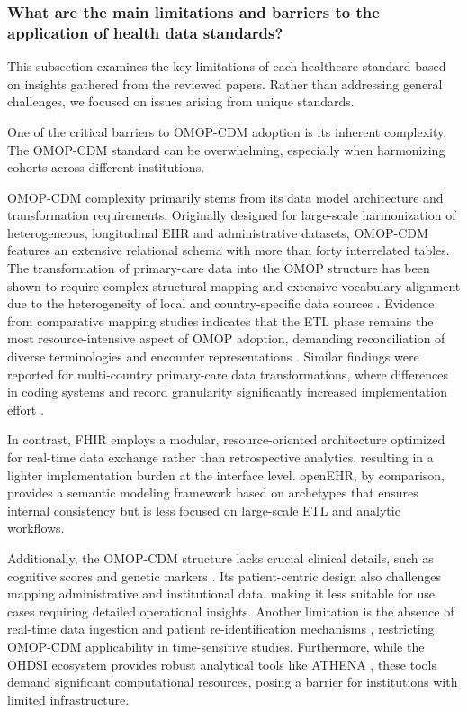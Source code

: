 \subsubsection{What are the main limitations and barriers to the application of health data standards?}
\label{sec:paper1_results_limitations}

This subsection examines the key limitations of each healthcare standard based on insights gathered from the reviewed papers. Rather than addressing general challenges, we focused on issues arising from unique standards.

One of the critical barriers to OMOP-CDM adoption is its inherent complexity. The OMOP-CDM standard can be overwhelming, especially when harmonizing cohorts across different institutions.

OMOP-CDM complexity primarily stems from its data model architecture and transformation requirements. Originally designed for large-scale harmonization of heterogeneous, longitudinal EHR and administrative datasets, OMOP-CDM features an extensive relational schema with more than forty interrelated tables. The transformation of primary-care data into the OMOP structure has been shown to require complex structural mapping and extensive vocabulary alignment due to the heterogeneity of local and country-specific data sources \cite{fruchart_transforming_2024}. Evidence from comparative mapping studies indicates that the ETL phase remains the most resource-intensive aspect of OMOP adoption, demanding reconciliation of diverse terminologies and encounter representations \cite{peng_etl-process_2023,papez_transforming_2023}. Similar findings were reported for multi-country primary-care data transformations, where differences in coding systems and record granularity significantly increased implementation effort \cite{kent_common_2021}.

In contrast, FHIR employs a modular, resource-oriented architecture optimized for real-time data exchange rather than retrospective analytics, resulting in a lighter implementation burden at the interface level. openEHR, by comparison, provides a semantic modeling framework based on archetypes that ensures internal consistency but is less focused on large-scale ETL and analytic workflows.

Additionally, the OMOP-CDM structure lacks crucial clinical details, such as cognitive scores and genetic markers \cite{byun_analysis_2022}. Its patient-centric design also challenges mapping administrative and institutional data, making it less suitable for use cases requiring detailed operational insights. Another limitation is the absence of real-time data ingestion and patient re-identification mechanisms \cite{paris_transformation_2021}, restricting OMOP-CDM applicability in time-sensitive studies. Furthermore, while the OHDSI ecosystem provides robust analytical tools like ATHENA \cite{seong_incorporation_2021}, these tools demand significant computational resources, posing a barrier for institutions with limited infrastructure.

